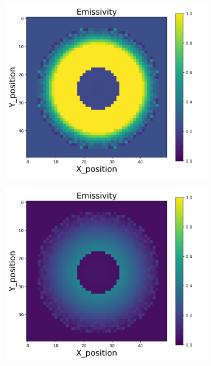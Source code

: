 \begin{figure}[p]
\begin{minipage}{\textwidth}
\begin{subfigure}{0.325\textwidth}
        \end{subfigure}
    \end{minipage}\\
    \begin{minipage}{\textwidth}
        \centering
        \begin{subfigure}{0.325\textwidth}
            \centering
            \includegraphics[width=\textwidth]{figures/raw_data/25/lin_square/emi_cal.jpg}
        \end{subfigure}
        \begin{subfigure}{0.325\textwidth}
            \centering
            \includegraphics[width=\textwidth]{figures/raw_data/26/lin_square/emi_cal.jpg}

\end{subfigure}
\end{minipage}
\end{figure}
